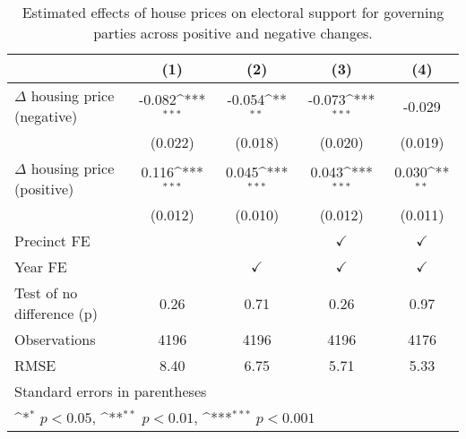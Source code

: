 \begin{table}[htbp]\centering
\def\sym#1{\ifmmode^{#1}\else\(^{#1}\)\fi}
\caption{Estimated effects of house prices on electoral support for governing parties across positive and negative changes.} \label{preposneg}
\begin{tabular}{l*{4}{c}}
\hline\hline
                    &\multicolumn{1}{c}{(1)}         &\multicolumn{1}{c}{(2)}         &\multicolumn{1}{c}{(3)}         &\multicolumn{1}{c}{(4)}         \\
\hline
$\Delta$ housing price (negative)&      -0.082\sym{***}&      -0.054\sym{**} &      -0.073\sym{***}&      -0.029         \\
                    &     (0.022)         &     (0.018)         &     (0.020)         &     (0.019)         \\
[1em]
$\Delta$ housing price (positive)&       0.116\sym{***}&       0.045\sym{***}&       0.043\sym{***}&       0.030\sym{**} \\
                    &     (0.012)         &     (0.010)         &     (0.012)         &     (0.011)         \\
[1em]
\hline Precinct FE  &                     &                     &$\checkmark$         &$\checkmark$         \\
[1em]
Year FE             &                     &$\checkmark$         &$\checkmark$         &$\checkmark$         \\
\hline
Test of no difference (p)&        0.26         &        0.71         &        0.26         &        0.97         \\
Observations        &        4196         &        4196         &        4196         &        4176         \\
RMSE                &        8.40         &        6.75         &        5.71         &        5.33         \\
\hline\hline
\multicolumn{5}{l}{\footnotesize Standard errors in parentheses}\\
\multicolumn{5}{l}{\footnotesize \sym{*} \(p<0.05\), \sym{**} \(p<0.01\), \sym{***} \(p<0.001\)}\\
\end{tabular}
\end{table}
